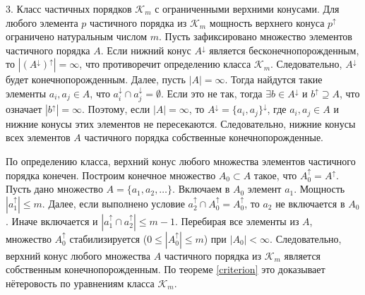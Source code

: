 \documentclass[12pt]{article}
\theoremstyle{break}
\def\K{\mathcal{K}_m}
\begin{document}
		3. Класс частичных порядков $\K$ с ограниченными верхними конусами. Для любого элемента $p$ частичного порядка из $\K$ мощность верхнего конуса $p^{\uparrow}$ ограничено натуральным числом $m$. Пусть зафиксировано множество элементов частичного порядка $A$. Если нижний конус $A^{\downarrow}$ является бесконечнопорожденным, то $|(A^{\downarrow})^{\uparrow}| = \infty$, что противоречит определению класса $\K$. Следовательно, $A^{\downarrow}$ будет конечнопорожденным. Далее, пусть $|A| = \infty$. Тогда найдутся такие элементы $a_{i}, a_{j}\in A$, что $a_{i}^{\downarrow} \cap a_{j}^{\downarrow} = \emptyset$. Если это не так, тогда $\exists b\in A^{\downarrow}$ и $b^{\uparrow} \supseteq A$, что означает $|b^{\uparrow}| = \infty$. Поэтому, если $|A|=\infty$, то $A^{\downarrow} = \{a_i, a_j\}^{\downarrow}$, где $a_i, a_j\in A$ и нижние конусы этих элементов не пересекаются. Следовательно, нижние конусы всех элементов $A$ частичного порядка собственные конечнопорожденные.

		По определению класса, верхний конус любого множества элементов частичного порядка конечен. Построим конечное множество $A_0\subset A$ такое, что $A_0^{\uparrow} = A^{\uparrow}$. Пусть дано множество $A = \{a_1, a_2,\dots\}.$ Включаем в $A_0$ элемент $a_1$. Мощность $|a_1^{\uparrow}| \leqslant m.$ Далее, если выполнено условие $a_2^{\uparrow} \cap A_0^{\uparrow} = A_0^{\uparrow}$, то $a_2$ не включается в $A_0$. Иначе включается и $|a_1^{\uparrow} \cap a_2^{\uparrow}| \leqslant m-1$. Перебирая все элементы из $A$, множество $A_0^{\uparrow}$ стабилизируется ($0 \leqslant |A_0^{\uparrow}| \leqslant m$) при $|A_0|<\infty$. Следовательно, верхний конус любого множества $A$ частичного порядка из $\K$ является собственным конечнопорожденным. По теореме \ref{criterion} это доказывает нётеровость по уравнениям класса $\K$.
	
\end{document}
